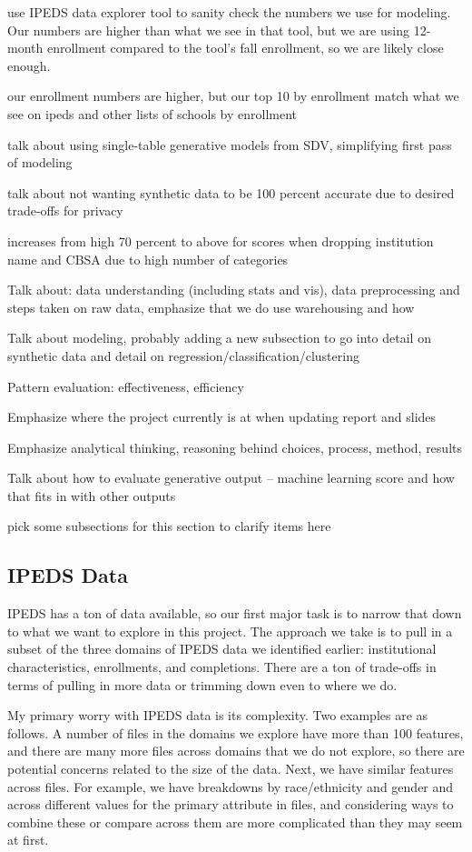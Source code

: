 \documentclass[sigconf, authorversion, nonacm]{acmart}
\begin{document}
        use IPEDS data explorer tool to sanity check the numbers we use for modeling. Our numbers are higher than what we see in that tool, but we are using 12-month enrollment compared to the tool's fall enrollment, so we are likely close enough.

        our enrollment numbers are higher, but our top 10 by enrollment match what we see on ipeds and other lists of schools by enrollment

        talk about using single-table generative models from SDV, simplifying first pass of modeling

        talk about not wanting synthetic data to be 100 percent accurate due to desired trade-offs for privacy

        increases from high 70 percent to above for scores when dropping institution name and CBSA due to high number of categories

        Talk about: data understanding (including stats and vis), data preprocessing and steps taken on raw data, emphasize that we do use warehousing and how

        Talk about modeling, probably adding a new subsection to go into detail on synthetic data and detail on regression/classification/clustering

        Pattern evaluation: effectiveness, efficiency

        Emphasize where the project currently is at when updating report and slides

        Emphasize analytical thinking, reasoning behind choices, process, method, results

        Talk about how to evaluate generative output -- machine learning score and how that fits in with other outputs

        pick some subsections for this section to clarify items here

    \subsection{IPEDS Data}
        IPEDS has a ton of data available, so our first major task is to narrow that down to what we want to explore in this project. The approach we take is to pull in a subset of the three domains of IPEDS data we identified earlier: institutional characteristics, enrollments, and completions. There are a ton of trade-offs in terms of pulling in more data or trimming down even to where we do.

        My primary worry with IPEDS data is its complexity. Two examples are as follows. A number of files in the domains we explore have more than 100 features, and there are many more files across domains that we do not explore, so there are potential concerns related to the size of the data. Next, we have similar features across files. For example, we have breakdowns by race/ethnicity and gender and across different values for the primary attribute in files, and considering ways to combine these or compare across them are more complicated than they may seem at first.
\end{document}
